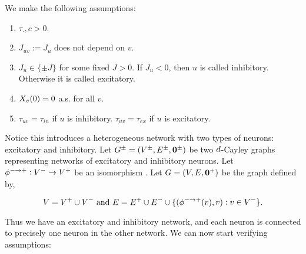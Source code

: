 \ind We make the following assumptions:

\begin{enumerate}
\item \(\tau_{\cdot},c > 0\).

\item \(J_{uv} := J_u\) does not depend on \(v\).

\item \(J_u \in \{\pm J\}\) for some fixed \(J > 0\). If \(J_u < 0\), then \(u\) is called inhibitory. Otherwise it is called excitatory.

\item \(X_{v}(0) = 0\) a.s. for all \(v\). 

\item \(\tau_{uv} = \tau_{in}\) if \(u\) is inhibitory. \(\tau_{uv} = \tau_{ex}\) if \(u\) is excitatory.
\end{enumerate}

 Notice this introduces a heterogeneous network with two types of neurons: excitatory and inhibitory. Let \(G^{\pm} = (V^\pm,E^\pm,\mathbf{0}^\pm)\) be two \(d\)-Cayley graphs representing networks of excitatory and inhibitory neurons. Let \(\phi^{-\rightarrow+}: V^- \rightarrow V^+\) be an isomorphism . Let \(G = (V,E,\mathbf{0}^+)\) be the graph defined by,

\[V = V^+\cup V^- \text{ and } E = E^+\cup E^-\cup \{(\phi^{-\rightarrow+}(v),v): v \in V^-\}.\]

Thus we have an excitatory and inhibitory network, and each neuron is connected to precisely one neuron in the other network. We can now start verifying assumptions:


